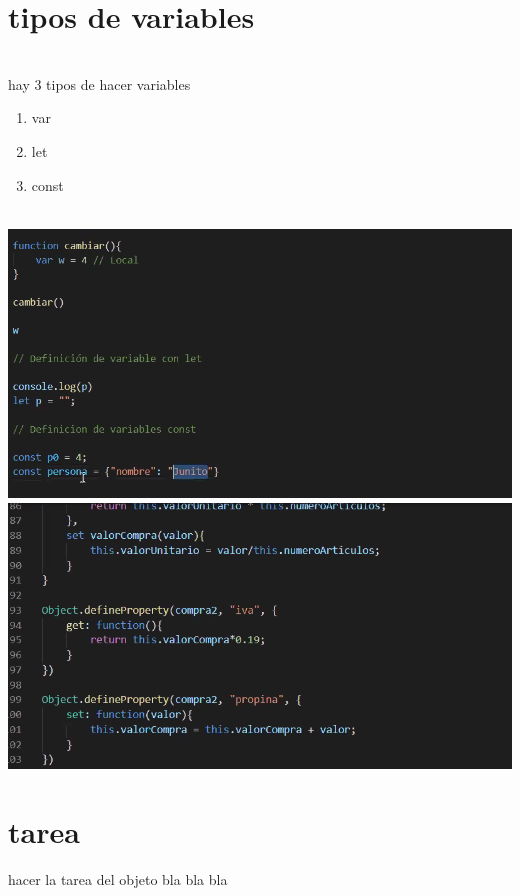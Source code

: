 \documentclass[10pt,a4paper]{article} %
\begin{document}
    \section{tipos de variables}
        \\
        hay 3 tipos de hacer variables
        \begin{enumerate}
            \item {var}
            \item {let}
            \item {const}
        \end{enumerate}
        \\\includegraphics[width=0.8\linewidth]{variables.png}
        \\\includegraphics[width=0.8\linewidth]{objetos.png}
        \\
        \section{tarea}
            hacer la tarea del objeto bla bla bla










    \nocite{*}
    
    
\end{document}
